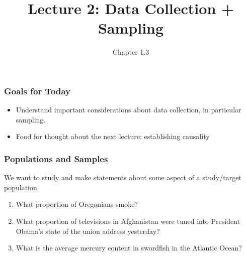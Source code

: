 \documentclass[handout]{beamer}
\title{Lecture 2: Data Collection + Sampling}
\author{Chapter 1.3}
\date{}
\newcommand{\blue}[1]{\textcolor{blue2}{#1}}
\begin{document}
\begin{frame}
\titlepage
\end{frame}


\begin{frame}
\frametitle{Goals for Today}
\begin{itemize}
  \item Understand important considerations about data collection, in particular \blue{sampling}.
  \item Food for thought about the next lecture: establishing \blue{causality}
\end{itemize}

\end{frame}


\begin{frame}
\frametitle{Populations and Samples}
We want to study and make statements about some aspect of a \blue{study/target population}.  

\begin{enumerate}
\pause\item What proportion of Oregonians smoke?
\pause\item What proportion of televisions in Afghanistan were tuned into President Obama's state of the union address yesterday?
\pause\item What is the average mercury content in swordfish in the Atlantic Ocean?
\end{enumerate}

\end{frame}
\end{document}
